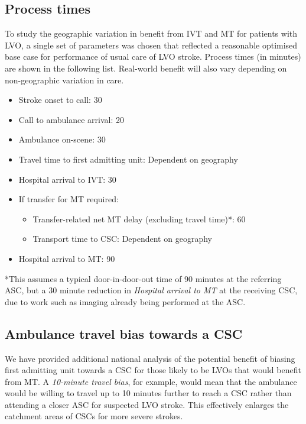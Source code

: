 \subsection{Process times}

To study the geographic variation in benefit from IVT and MT for patients with LVO, a single set of parameters was chosen that reflected a reasonable optimised base case for performance of usual care of LVO stroke. Process times (in minutes) are shown in the following list. Real-world benefit will also vary depending on non-geographic variation in care.

\vspace{5mm}

\begin{minipage}{1.0\textwidth}  %
\begin{itemize}
    \item Stroke onset to call: 30
    \item Call to ambulance arrival: 20
    \item Ambulance on-scene: 30
    \item Travel time to first admitting unit: Dependent on geography
    \item Hospital arrival to IVT: 30
    \item If transfer for MT required:
    \begin{itemize}
        \item Transfer-related net MT delay (excluding travel time)*: 60
        \item Transport time to CSC: Dependent on geography
    \end{itemize}
    \item Hospital arrival to MT: 90
\end{itemize}

*This assumes a typical door-in-door-out time of 90 minutes at the referring ASC, but a 30 minute reduction in \textit{Hospital arrival to MT} at the receiving CSC, due to work such as imaging already being performed at the ASC.
\end{minipage}

\subsection{Ambulance travel bias towards a CSC}

We have provided additional national analysis of the potential benefit of biasing first admitting unit towards a CSC for those likely to be LVOs that would benefit from MT. A \textit{10-minute travel bias}, for example, would mean that the ambulance would be willing to travel up to 10 minutes further to reach a CSC rather than attending a closer ASC for suspected LVO stroke. This effectively enlarges the catchment areas of CSCs for more severe strokes.